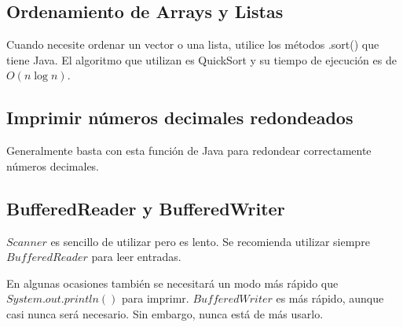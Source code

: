 \documentclass{article}
\begin{document}
\begin{multicols}{2}
	\subsection{Ordenamiento de Arrays y Listas}
	Cuando necesite ordenar un vector o una lista, utilice los métodos .sort() que tiene 		Java. El algoritmo que utilizan es QuickSort y su tiempo de ejecución es de \( O(n\log n) \).	
	
	\subsection{Imprimir números decimales redondeados}
	Generalmente basta con esta función de Java para redondear correctamente números decimales.	
	
	\subsection{BufferedReader y BufferedWriter}
	\(Scanner\) es sencillo de utilizar pero es lento. Se recomienda utilizar siempre \(BufferedReader\) para leer entradas.
	
	En algunas ocasiones también se necesitará un modo más rápido que \(System.out.println()\) para imprimr. \(BufferedWriter\) es más rápido, aunque casi nunca será necesario. Sin embargo, nunca está de más usarlo.
	
\end{multicols}	
\end{document}
